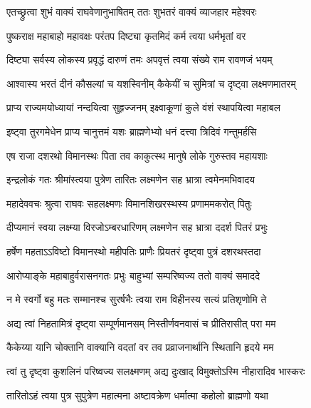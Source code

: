 
\twolineshloka
{एतच्छ्रुत्वा शुभं वाक्यं राघवेणानुभाषितम्}
{ततः शुभतरं वाक्यं व्याजहार महेश्वरः} %

\twolineshloka
{पुष्कराक्ष महाबाहो महावक्षः परंतप}
{दिष्ट्या कृतमिदं कर्म त्वया धर्मभृतां वर} %

\twolineshloka
{दिष्ट्या सर्वस्य लोकस्य प्रवृद्धं दारुणं तमः}
{अपवृत्तं त्वया संख्ये राम रावणजं भयम्} %

\twolineshloka
{आश्वास्य भरतं दीनं कौसल्यां च यशस्विनीम्}
{कैकेयीं च सुमित्रां च दृष्ट्वा लक्ष्मणमातरम्} %

\twolineshloka
{प्राप्य राज्यमयोध्यायां नन्दयित्वा सुहृज्जनम्}
{इक्ष्वाकूणां कुले वंशं स्थापयित्वा महाबल} %

\twolineshloka
{इष्ट्वा तुरगमेधेन प्राप्य चानुत्तमं यशः}
{ब्राह्मणेभ्यो धनं दत्त्वा त्रिदिवं गन्तुमर्हसि} %

\twolineshloka
{एष राजा दशरथो विमानस्थः पिता तव}
{काकुत्स्थ मानुषे लोके गुरुस्तव महायशाः} %

\twolineshloka
{इन्द्रलोकं गतः श्रीमांस्त्वया पुत्रेण तारितः}
{लक्ष्मणेन सह भ्रात्रा त्वमेनमभिवादय} %

\twolineshloka
{महादेववचः श्रुत्वा राघवः सहलक्ष्मणः}
{विमानशिखरस्थस्य प्रणाममकरोत् पितुः} %

\twolineshloka
{दीप्यमानं स्वया लक्ष्म्या विरजोऽम्बरधारिणम्}
{लक्ष्मणेन सह भ्रात्रा ददर्श पितरं प्रभुः} %

\twolineshloka
{हर्षेण महताऽऽविष्टो विमानस्थो महीपतिः}
{प्राणैः प्रियतरं दृष्ट्वा पुत्रं दशरथस्तदा} %

\twolineshloka
{आरोप्याङ्के महाबाहुर्वरासनगतः प्रभुः}
{बाहुभ्यां सम्परिष्वज्य ततो वाक्यं समाददे} %

\twolineshloka
{न मे स्वर्गो बहु मतः सम्मानश्च सुरर्षभैः}
{त्वया राम विहीनस्य सत्यं प्रतिशृणोमि ते} %

\twolineshloka
{अद्य त्वां निहतामित्रं दृष्ट्वा सम्पूर्णमानसम्}
{निस्तीर्णवनवासं च प्रीतिरासीत् परा मम} %

\twolineshloka
{कैकेय्या यानि चोक्तानि वाक्यानि वदतां वर}
{तव प्रव्राजनार्थानि स्थितानि हृदये मम} %

\twolineshloka
{त्वां तु दृष्ट्वा कुशलिनं परिष्वज्य सलक्ष्मणम्}
{अद्य दुःखाद् विमुक्तोऽस्मि नीहारादिव भास्करः} %

\twolineshloka
{तारितोऽहं त्वया पुत्र सुपुत्रेण महात्मना}
{अष्टावक्रेण धर्मात्मा कहोलो ब्राह्मणो यथा} %

